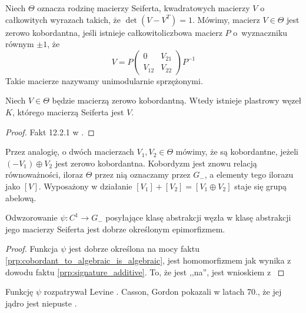 
Niech $\Theta$ oznacza rodzinę macierzy Seiferta, kwadratowych macierzy $V$ o całkowitych wyrazach takich, że $\det (V - V^T) = 1$.
Mówimy, macierz $V \in \Theta$ jest zerowo kobordantna, jeśli istnieje całkowitoliczbowa macierz $P$ o~wyznaczniku równym $\pm 1$, że
\begin{equation}
    V = P \begin{pmatrix} 0 & V_{21} \\ V_{12} & V_{22} \end{pmatrix} P^{-1}
\end{equation}
Takie macierze nazywamy unimodularnie sprzężonymi.

\begin{proposition}
    Niech $V \in \Theta$ będzie macierzą zerowo kobordantną.
    Wtedy istnieje plastrowy węzeł $K$, którego macierzą Seiferta jest $V$.
\end{proposition}

\begin{proof}
    Fakt 12.2.1 w \cite{kawauchi96}.
\end{proof}

Przez analogię, o dwóch macierzach $V_1, V_2 \in \Theta$ mówimy, że są kobordantne, jeżeli $(-V_1) \oplus V_2$ jest zerowo kobordantna.
Kobordyzm jest znowu relacją równoważności, iloraz $\Theta$ przez nią oznaczamy przez $G_-$, a elementy tego ilorazu jako $[V]$.
Wyposażony w działanie $[V_1] + [V_2] = [V_1 \oplus V_2]$ staje się grupą abelową.

\begin{proposition}
    Odwzorowanie $\psi \colon C^1 \to G_-$ posyłające klasę abstrakcji węzła w klasę abstrakcji jego macierzy Seiferta jest dobrze określonym epimorfizmem.
\end{proposition}

\begin{proof}
    Funkcja $\psi$ jest dobrze określona na mocy faktu \ref{prp:cobordant_to_algebraic_is_algebraic}, jest homomorfizmem jak wynika z dowodu faktu \ref{prp:signature_additive}.
    To, że jest ,,na'', jest wnioskiem z \cite[s. 62]{kawauchi96}
\end{proof}

Funkcję $\psi$ rozpatrywał Levine \cite{levine69}.
Casson, Gordon pokazali w latach 70., że jej jądro jest niepuste \cite{gordon78}.

